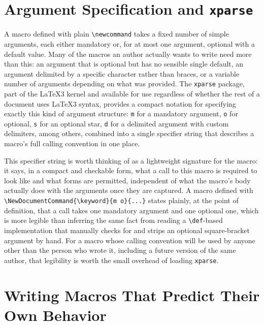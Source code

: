 \hypertarget{argument-specification-and-xparse}{%
\section{\texorpdfstring{Argument Specification and \texttt{xparse}}{Argument Specification and xparse}}\label{argument-specification-and-xparse}}

A macro defined with plain \texttt{\textbackslash{}newcommand} takes a fixed number of simple arguments, each either mandatory or, for at most one argument, optional with a default value. Many of the macros an author actually wants to write need more than this: an argument that is optional but has no sensible single default, an argument delimited by a specific character rather than braces, or a variable number of arguments depending on what was provided. The \texttt{xparse} package, part of the LaTeX3 kernel and available for use regardless of whether the rest of a document uses LaTeX3 syntax, provides a compact notation for specifying exactly this kind of argument structure: \texttt{m} for a mandatory argument, \texttt{o} for optional, \texttt{s} for an optional star, \texttt{d} for a delimited argument with custom delimiters, among others, combined into a single specifier string that describes a macro's full calling convention in one place.

This specifier string is worth thinking of as a lightweight signature for the macro: it says, in a compact and checkable form, what a call to this macro is required to look like and what forms are permitted, independent of what the macro's body actually does with the arguments once they are captured. A macro defined with \texttt{\textbackslash{}NewDocumentCommand\{\textbackslash{}keyword\}\{m\ o\}\{...\}} states plainly, at the point of definition, that a call takes one mandatory argument and one optional one, which is more legible than inferring the same fact from reading a \texttt{\textbackslash{}def}-based implementation that manually checks for and strips an optional square-bracket argument by hand. For a macro whose calling convention will be used by anyone other than the person who wrote it, including a future version of the same author, that legibility is worth the small overhead of loading \texttt{xparse}.

\hypertarget{writing-macros-that-predict-their-own-behavior}{%
\section{Writing Macros That Predict Their Own Behavior}\label{writing-macros-that-predict-their-own-behavior}}

